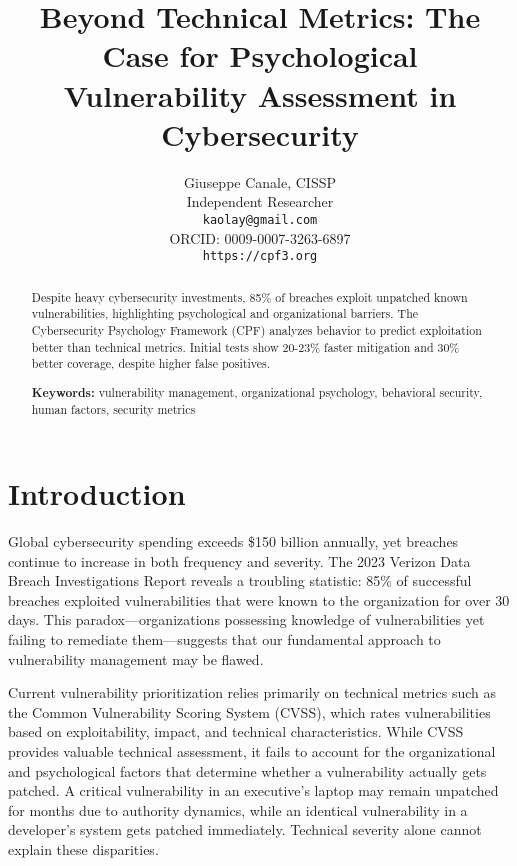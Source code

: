 \documentclass[11pt,a4paper]{article}
\begin{document}
\title{\Large \textbf{Beyond Technical Metrics: The Case for Psychological\\Vulnerability Assessment in Cybersecurity}}

\author{
Giuseppe Canale, CISSP\\
Independent Researcher\\
\texttt{kaolay@gmail.com}\\
ORCID: 0009-0007-3263-6897\\
\texttt{https://cpf3.org}
}

\date{}

\maketitle

\begin{abstract}
\noindent
Despite heavy cybersecurity investments, 85\% of breaches exploit unpatched known vulnerabilities, highlighting psychological and organizational barriers. The Cybersecurity Psychology Framework (CPF) analyzes behavior to predict exploitation better than technical metrics. Initial tests show 20-23\% faster mitigation and 30\% better coverage, despite higher false positives.

\vspace{0.5em}
\noindent\textbf{Keywords:} vulnerability management, organizational psychology, behavioral security, human factors, security metrics
\end{abstract}

\section{Introduction}

Global cybersecurity spending exceeds \$150 billion annually\cite{gartner2023}, yet breaches continue to increase in both frequency and severity. The 2023 Verizon Data Breach Investigations Report reveals a troubling statistic: 85\% of successful breaches exploited vulnerabilities that were known to the organization for over 30 days\cite{verizon2023}. This paradox—organizations possessing knowledge of vulnerabilities yet failing to remediate them—suggests that our fundamental approach to vulnerability management may be flawed.

Current vulnerability prioritization relies primarily on technical metrics such as the Common Vulnerability Scoring System (CVSS), which rates vulnerabilities based on exploitability, impact, and technical characteristics. While CVSS provides valuable technical assessment, it fails to account for the organizational and psychological factors that determine whether a vulnerability actually gets patched. A critical vulnerability in an executive's laptop may remain unpatched for months due to authority dynamics, while an identical vulnerability in a developer's system gets patched immediately. Technical severity alone cannot explain these disparities.
\end{document}
